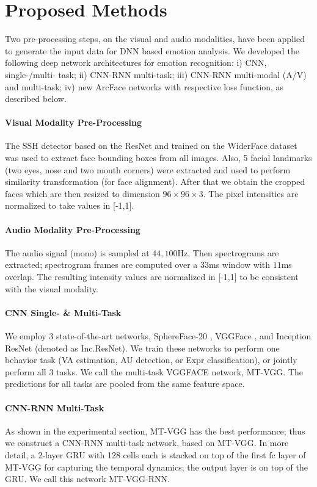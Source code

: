 \documentclass{bmvc2k}
\begin{document}
\section{Proposed Methods}
\vskip-0.15cm
\noindent Two pre-processing steps, on the visual and audio modalities, have been applied to generate the input data for DNN based emotion analysis. We developed the following deep network architectures for emotion recognition: i) CNN, single-/multi- task; ii) CNN-RNN multi-task; iii) CNN-RNN multi-modal (A/V) and multi-task; iv) new ArcFace networks with respective loss function, as described below.  

\paragraph{Visual Modality Pre-Processing}  
The SSH detector \cite{najibi2017ssh} based on the ResNet and trained on the WiderFace dataset \cite{yang2016wider} was used to extract face bounding boxes from all images. Also, 5 facial landmarks (two eyes, nose and two mouth corners) were extracted and used to perform similarity transformation (for face alignment). After that we obtain the cropped faces which are then resized to dimension $96 \times 96 \times 3$. The pixel intensities are normalized to take values in [-1,1].

\paragraph{Audio Modality Pre-Processing}  
The audio signal (mono) is sampled at $44,100$Hz. Then spectrograms are extracted; spectrogram frames are computed over a $33$ms window with $11$ms overlap. The resulting intensity values are normalized in [-1,1] to be consistent with the visual modality.

\paragraph{CNN Single- \& Multi-Task} 
We employ 3 state-of-the-art networks, SphereFace-20 \cite{liu2017sphereface},  VGGFace \cite{parkhi2015deep}, and Inception ResNet \cite{szegedy2017inception} (denoted as Inc.ResNet). We train these networks to perform one behavior task (VA estimation, AU detection, or Expr classification), or jointly  perform all 3 tasks.
We call the multi-task VGGFACE network, MT-VGG.
The predictions for all tasks are pooled from the same feature space.

\paragraph{CNN-RNN Multi-Task} 
As shown in the experimental section, MT-VGG has the best performance; thus we construct a CNN-RNN multi-task network, based on MT-VGG. In more detail, a 2-layer GRU with 128 cells each is stacked on top of the first fc layer of MT-VGG for capturing the temporal dynamics; the output layer is on top of the GRU. We call this network MT-VGG-RNN.
\end{document}
